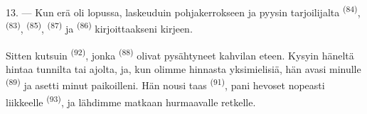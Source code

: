 13. --- Kun erä oli lopussa, laskeuduin pohjakerrokseen ja pyysin tarjoilijalta
 \textsuperscript{(84)}, 
\textsuperscript{(83)},  \textsuperscript{(85)},
 \textsuperscript{(87)} ja 
\textsuperscript{(86)} kirjoittaakseni kirjeen.

Sitten kutsuin  \textsuperscript{(92)}, jonka
 \textsuperscript{(88)} olivat pysähtyneet kahvilan eteen. Kysyin
häneltä hintaa tunnilta tai ajolta, ja, kun olimme hinnasta yksimielisiä, hän
avasi minulle  \textsuperscript{(89)} ja asetti minut
paikoilleni. Hän nousi taas  \textsuperscript{(91)}, pani
hevoset nopeasti liikkeelle  \textsuperscript{(93)},
ja lähdimme matkaan hurmaavalle retkelle.
\VUsaut{6.0mm}
\VUfilet{22mm}
